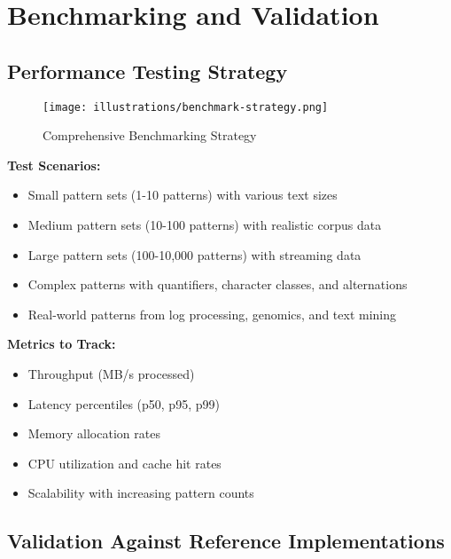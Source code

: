 \documentclass[11pt,a4paper]{article}
\begin{document}
\section{Benchmarking and Validation}

\subsection{Performance Testing Strategy}

\begin{figure}[htbp]
\centering
\texttt{[image: illustrations/benchmark-strategy.png]}
\caption{Comprehensive Benchmarking Strategy}
\label{fig:benchmark}
\end{figure}

\textbf{Test Scenarios:}
\begin{itemize}
\item Small pattern sets (1-10 patterns) with various text sizes
\item Medium pattern sets (10-100 patterns) with realistic corpus data  
\item Large pattern sets (100-10,000 patterns) with streaming data
\item Complex patterns with quantifiers, character classes, and alternations
\item Real-world patterns from log processing, genomics, and text mining
\end{itemize}

\textbf{Metrics to Track:}
\begin{itemize}
\item Throughput (MB/s processed)
\item Latency percentiles (p50, p95, p99)
\item Memory allocation rates
\item CPU utilization and cache hit rates
\item Scalability with increasing pattern counts
\end{itemize}

\subsection{Validation Against Reference Implementations}
\end{document}

